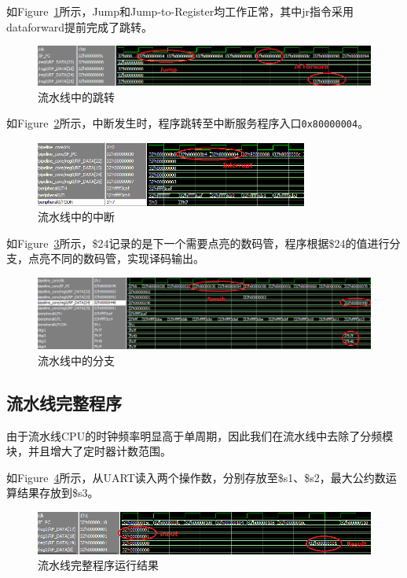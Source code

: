 \documentclass{article}
\begin{document}
            如Figure~\ref{fig:pipeline_digitest1}所示，Jump和Jump-to-Register均工作正常，其中jr指令采用dataforward提前完成了跳转。
            \begin{figure}[H]
                \centering
                \includegraphics[width=\textwidth]{images/pipeline_digitest1.png}
                \caption{\label{fig:pipeline_digitest1}流水线中的跳转}
            \end{figure}
            如Figure~\ref{fig:pipeline_digitest2}所示，中断发生时，程序跳转至中断服务程序入口\texttt{0x80000004}。
            \begin{figure}[H]
                \centering
                \includegraphics[width=0.8\textwidth]{images/pipeline_digitest2.png}
                \caption{\label{fig:pipeline_digitest2}流水线中的中断}
            \end{figure}
            如Figure~\ref{fig:pipeline_digitest3}所示，\$24记录的是下一个需要点亮的数码管，程序根据\$24的值进行分支，点亮不同的数码管，实现译码输出。
            \begin{figure}[H]
                \centering
                \includegraphics[width=\textwidth]{images/pipeline_digitest3.png}
                \caption{\label{fig:pipeline_digitest3}流水线中的分支}
            \end{figure}

        \subsection{流水线完整程序}
            由于流水线CPU的时钟频率明显高于单周期，因此我们在流水线中去除了分频模块，并且增大了定时器计数范围。

            如Figure~\ref{fig:pipeline_full}所示，从UART读入两个操作数，分别存放至\$s1、\$s2，最大公约数运算结果存放到\$s3。
            \begin{figure}[H]
                \centering
                \includegraphics[width=\textwidth]{images/pipeline_full.png}
                \caption{\label{fig:pipeline_full}流水线完整程序运行结果}
            \end{figure}
\end{document}
